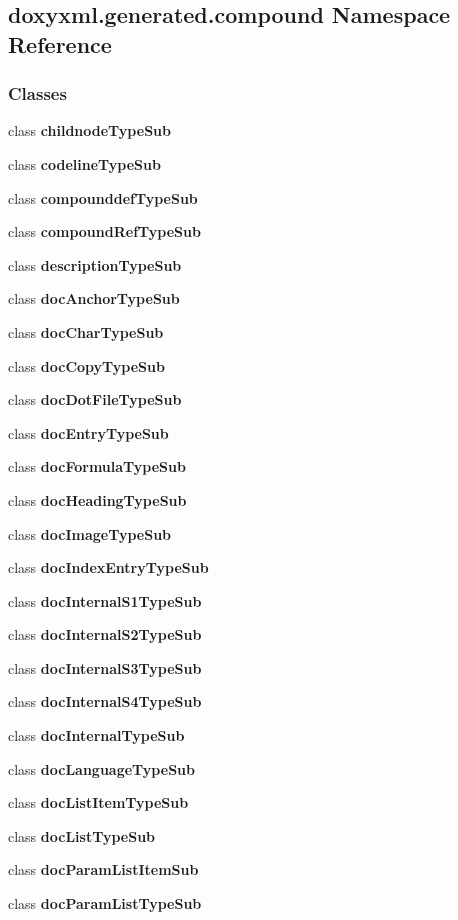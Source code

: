 \subsection{doxyxml.\+generated.\+compound Namespace Reference}
\label{namespacedoxyxml_1_1generated_1_1compound}
\subsubsection*{Classes}
\begin{DoxyCompactItemize}
\item 
class {\bf childnode\+Type\+Sub}
\item 
class {\bf codeline\+Type\+Sub}
\item 
class {\bf compounddef\+Type\+Sub}
\item 
class {\bf compound\+Ref\+Type\+Sub}
\item 
class {\bf description\+Type\+Sub}
\item 
class {\bf doc\+Anchor\+Type\+Sub}
\item 
class {\bf doc\+Char\+Type\+Sub}
\item 
class {\bf doc\+Copy\+Type\+Sub}
\item 
class {\bf doc\+Dot\+File\+Type\+Sub}
\item 
class {\bf doc\+Entry\+Type\+Sub}
\item 
class {\bf doc\+Formula\+Type\+Sub}
\item 
class {\bf doc\+Heading\+Type\+Sub}
\item 
class {\bf doc\+Image\+Type\+Sub}
\item 
class {\bf doc\+Index\+Entry\+Type\+Sub}
\item 
class {\bf doc\+Internal\+S1\+Type\+Sub}
\item 
class {\bf doc\+Internal\+S2\+Type\+Sub}
\item 
class {\bf doc\+Internal\+S3\+Type\+Sub}
\item 
class {\bf doc\+Internal\+S4\+Type\+Sub}
\item 
class {\bf doc\+Internal\+Type\+Sub}
\item 
class {\bf doc\+Language\+Type\+Sub}
\item 
class {\bf doc\+List\+Item\+Type\+Sub}
\item 
class {\bf doc\+List\+Type\+Sub}
\item 
class {\bf doc\+Param\+List\+Item\+Sub}
\item 
class {\bf doc\+Param\+List\+Type\+Sub}

\end{DoxyCompactItemize}
